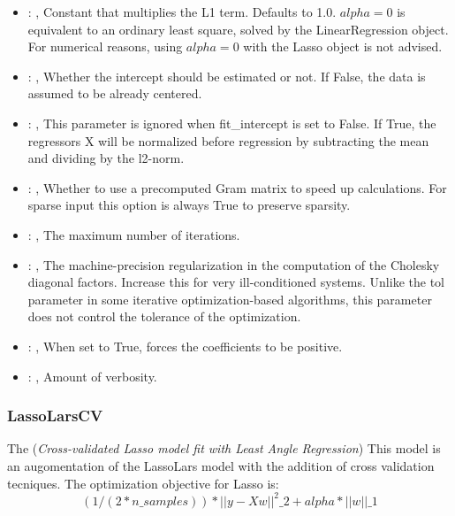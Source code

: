 \begin{itemize}
    \item {}: , 
      Constant that multiplies the L1 term. Defaults to 1.0.
      $alpha = 0$ is equivalent to an ordinary least square, solved by
      the LinearRegression object. For numerical reasons, using $alpha = 0$
      with the Lasso object is not advised.

    \item {}: , 
      Whether the intercept should be estimated or not. If False,
      the data is assumed to be already centered.

    \item {}: , 
      This parameter is ignored when fit\_intercept is set to False. If True,
      the regressors X will be normalized before regression by subtracting the mean and
      dividing by the l2-norm.

    \item {}: , 
      Whether to use a precomputed Gram matrix to speed up calculations.
      For sparse input this option is always True to preserve sparsity.

    \item {}: , 
      The maximum number of iterations.

    \item {}: , 
      The machine-precision regularization in the computation of the Cholesky
      diagonal factors. Increase this for very ill-conditioned systems. Unlike the tol
      parameter in some iterative optimization-based algorithms, this parameter does not
      control the tolerance of the optimization.

    \item {}: , 
      When set to True, forces the coefficients to be positive.

    \item {}: , 
      Amount of verbosity.
  \end{itemize}


\subsubsection{LassoLarsCV}
  The  (\textit{Cross-validated Lasso model fit with Least Angle Regression})
  This model is an augomentation of the LassoLars model with the addition of
  cross validation tecniques.                         The optimization objective for Lasso is:
  \begin{equation}                          (1 / (2 * n\_samples)) * ||y - Xw||^2\_2 + alpha *
  ||w||\_1                         \end{equation}


